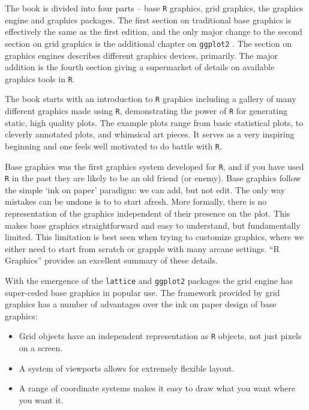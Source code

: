 \documentclass[12pt]{article}
\begin{document}
The book is divided into four parts -- base \texttt{R} graphics, grid graphics,
the graphics engine and graphics packages. The first section on
traditional base graphics is effectively the same as the first edition, and the
only major change to the second section on grid graphics is the
additional chapter on \texttt{ggplot2} \citep{ggplot2}.  The section on graphics
engines describes different graphics devices, primarily. The major
addition is the fourth section giving a supermarket of details on
available graphics tools in \texttt{R}.

The book starts with an introduction to \texttt{R} graphics including a gallery
of many different graphics made using \texttt{R}, demonstrating the power of \texttt{R}
for generating static, high quality plots. The example plots range
from basic statistical plots, to cleverly annotated plots, and
whimsical art pieces. It serves as a very inspiring beginning and one feels
well motivated to do battle with \texttt{R}.

Base graphics was the first graphics system developed for \texttt{R}, and if
you have used \texttt{R} in the past they are likely to be an old friend (or
enemy). Base graphics follow the simple `ink on paper' paradigm:  we can add, but not edit. The only way mistakes can be undone is to to start
afresh. More formally, there is no representation of the graphics
independent of their presence on the plot. This makes base graphics straightforward and
easy to understand, but fundamentally limited.  This limitation is
best seen when trying to customize graphics, where we either need to
start from scratch or grapple with many arcane settings. ``R
Graphics'' provides an excellent summary of these details.

With the emergence of the \texttt{lattice} \citep{sarkar2008} and \texttt{ggplot2}
packages the grid engine has super-ceded base graphics in popular use.
The framework provided by grid graphics has a number of advantages
over the ink on paper design of base graphics:

\begin{itemize} \itemsep 0in

\item Grid objects have an independent representation as \texttt{R} objects,
not just pixels on a screen.

\item A system of viewports allows for extremely flexible layout.

\item A range of coordinate systems makes it easy to draw what you
want where you want it.

\end{itemize}
\end{document}
